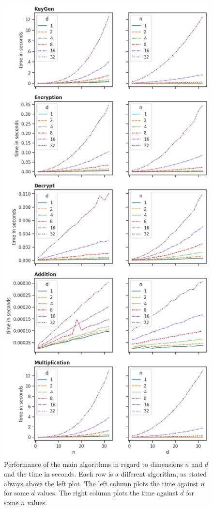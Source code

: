 \begin{figure}[htp]
  \centering
  \includegraphics[scale=0.54]{images/nd-performance.png}
  \caption[Performance of the HE algorithms by $n$ and $d$]{Performance of the main algorithms in regard to dimensions $n$ and $d$ and the time in seconds. Each row is a different algorithm, as stated always above the left plot. The left column plots the time against $n$ for some $d$ values. The right column plots the time against $d$ for some $n$ values.}
  \label{fig:nd-performance}
\end{figure}


